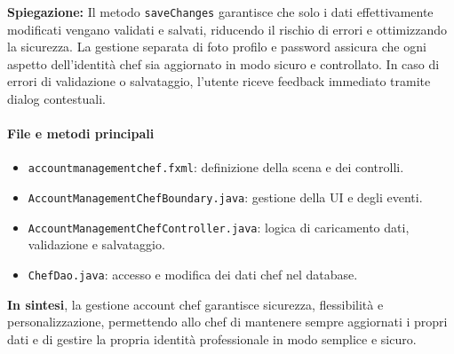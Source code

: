 \textbf{Spiegazione:} Il metodo \texttt{saveChanges} garantisce che solo i dati effettivamente modificati vengano validati e salvati, riducendo il rischio di errori e ottimizzando la sicurezza. La gestione separata di foto profilo e password assicura che ogni aspetto dell'identità chef sia aggiornato in modo sicuro e controllato. In caso di errori di validazione o salvataggio, l'utente riceve feedback immediato tramite dialog contestuali.

\paragraph{File e metodi principali}
\begin{itemize}
    \item \texttt{accountmanagementchef.fxml}: definizione della scena e dei controlli.
    \item \texttt{AccountManagementChefBoundary.java}: gestione della UI e degli eventi.
    \item \texttt{AccountManagementChefController.java}: logica di caricamento dati, validazione e salvataggio.
    \item \texttt{ChefDao.java}: accesso e modifica dei dati chef nel database.
\end{itemize}

\textbf{In sintesi}, la gestione account chef garantisce sicurezza, flessibilità e personalizzazione, permettendo allo chef di mantenere sempre aggiornati i propri dati e di gestire la propria identità professionale in modo semplice e sicuro.
